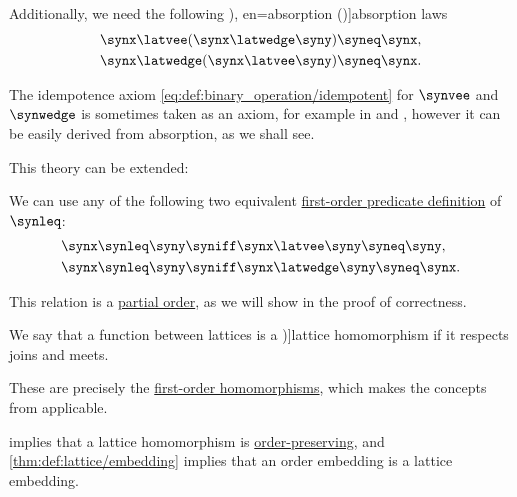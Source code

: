 \begin{definition}
\begin{thmenum}
\begin{thmenum}[series=def:lattice]
       Additionally, we need the following \term[ru=(законы) поглощения (\cite[6]{Гуров2013ТеорияРешёток}), en=absorption (\cite[8]{Birkhoff1967LatticeTheory})]{absorption} laws
      \begin{align}
        \synx \latvee (\synx \latwedge \syny) &\syneq \synx, \label{eq:def:lattice/theory/absorption/join} \\
        \synx \latwedge (\synx \latvee \syny) &\syneq \synx. \label{eq:def:lattice/theory/absorption/meet}
      \end{align}
    \end{thmenum}

    The idempotence axiom \eqref{eq:def:binary_operation/idempotent} for \( \synvee \) and \( \synwedge \) is sometimes taken as an axiom, for example in \cite[def. 4.2]{Гуров2013ТеорияРешёток} and \cite[12]{Grätzer2011LatticeTheory}, however it can be easily derived from absorption, as we shall see.

    This theory can be extended:
    \begin{thmenum}[resume=def:lattice]
       We can use any of the following two equivalent \hyperref[def:fol_definition/predicate]{first-order predicate definition} of \( {\synleq} \):
      \begin{align}
        \synx \synleq \syny &\syniff \synx \latvee \syny \syneq \syny, \label{eq:def:lattice/theory/leq/join} \\
        \synx \synleq \syny &\syniff \synx \latwedge \syny \syneq \synx. \label{eq:def:lattice/theory/leq/meet}
      \end{align}

      This relation is a \hyperref[def:partially_ordered_set]{partial order}, as we will show in the proof of correctness.
    \end{thmenum}

     We say that a function between lattices is a \term[ru=решёточный гомоморфизм, en=homomorphism (of lattices) (\cite[30]{Grätzer2011LatticeTheory})]{lattice homomorphism} if it respects joins and meets.

    These are precisely the \hyperref[def:fol_homomorphism]{first-order homomorphisms}, which makes the concepts from  applicable.

     implies that a lattice homomorphism is \hyperref[def:order_function/preserving]{order-preserving}, and \cref{thm:def:lattice/embedding} implies that an order embedding is a lattice embedding.


\end{thmenum}
\end{definition}

